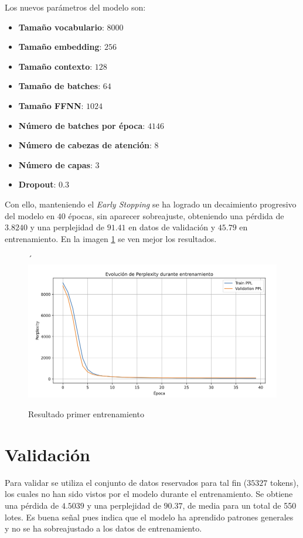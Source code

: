 \documentclass[11pt]{book}
\theoremstyle{plain}
\theoremstyle{definition}
\begin{document}
Los nuevos parámetros del modelo son:
\begin{itemize}
    \item \textbf{Tamaño vocabulario}: $8000$
    \item \textbf{Tamaño embedding}: $256$
    \item \textbf{Tamaño contexto}: $128$
    \item \textbf{Tamaño de batches}: $64$
    \item \textbf{Tamaño FFNN}: $1024$
    \item \textbf{Número de batches por época}: $4146$
    \item \textbf{Número de cabezas de atención}: $8$
    \item \textbf{Número de capas}: $3$
    \item \textbf{Dropout}: $0.3$
\end{itemize}
Con ello, manteniendo el \textit{Early Stopping} se ha logrado un decaimiento progresivo del modelo en $40$ épocas, sin aparecer sobreajuste, obteniendo una pérdida de $3.8240$ y una perplejidad de $91.41$ en datos de validación y $45.79$ en entrenamiento. En la imagen \ref{fig:placeholder25} se ven mejor los resultados.


\begin{figure}[h]
    \centering´
    \includegraphics[width=0.5\linewidth]{img/resultado_entrenamiento_v2.png}
    \caption{Resultado primer entrenamiento}
    \label{fig:placeholder25}
\end{figure}

\section{Validación}
Para validar se utiliza el conjunto de datos reservados para tal fin ($35327$ tokens), los cuales no han sido vistos por el modelo durante el entrenamiento. Se obtiene una pérdida de $4.5039$ y una perplejidad de $90.37$, de media para un total de 550 lotes. Es buena señal pues indica que el modelo ha aprendido patrones generales y no se ha sobreajustado a los datos de entrenamiento.


\end{document}
